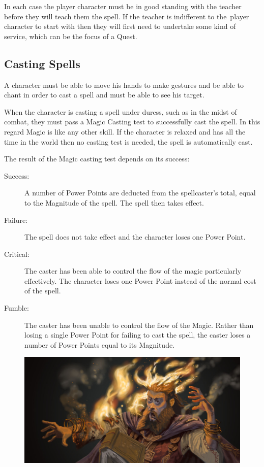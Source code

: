 In each case the player character must be in good standing with the teacher before they will teach them the spell. If the teacher is indifferent to the player character to start with then they will first need to undertake some kind of service, which can be the focus of a Quest.

\subsection{Casting Spells}
A character must be able to move his hands to make gestures and be able to chant in order to cast a spell and must be able to see his target. 

When the character is casting a spell under duress, such as in the midst of combat, they must pass a Magic Casting test to successfully cast the spell. In this regard Magic is like any other skill. If the character is relaxed and has all the time in the world then no casting test is needed, the spell is automatically cast.

The result of the Magic casting test depends on its success:
\begin{description}
	\item[Success:] A number of Power Points are deducted from the spellcaster’s total, equal to the Magnitude of the spell. The spell then takes effect.
	\item[Failure:] The spell does not take effect and the character loses one Power Point.
	\item[Critical:] The caster has been able to control the flow of the magic particularly effectively. The character loses one Power Point instead of the normal cost of the spell.
	\item[Fumble:] The caster has been unable to control the flow of the Magic. Rather than losing a single Power Point for failing to cast the spell, the caster loses a number of Power Points equal to its Magnitude. 
\end{description}

\begin{figure}[h]
\begin{center}
\includegraphics[scale=0.23]{img/backfire_by_ncorva.jpg}
\end{center}
\end{figure}


